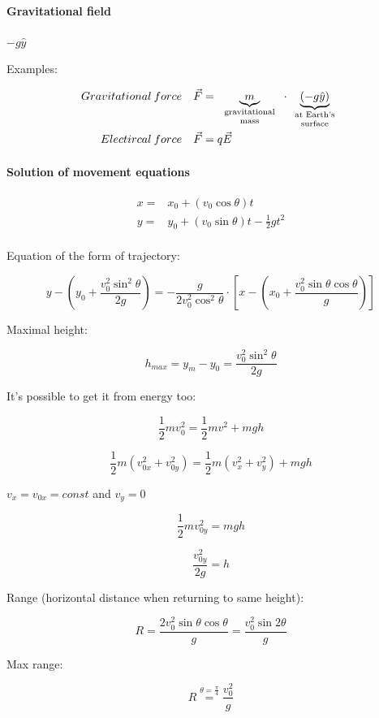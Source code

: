 \paragraph{Gravitational field} $-g\hat{y}$

Examples:

\begin{align*}
Gravitational \: force \quad& \vec{F} = \underbrace{m}_{\parbox{2cm}{\scriptsize  \centering gravitational\\ mass}} \cdot \underbrace{(-g\hat{y})}_{\parbox{1.6cm}{\scriptsize  \centering at Earth's\\ surface}} \\
Electircal \: force \quad& \vec{F} = q\vec{E} \\
\end{align*}

\paragraph{Solution of movement equations} 
 \begin{align*}
x = & x_0 + (v_0 \cos \theta)t  \\
y = & y_0 + (v_0 \sin \theta)t - \frac{1}{2}gt^2\\
\end{align*}

Equation of the form of trajectory:

$$y-\left( y_0 + \frac{v_0^2 \sin^2 \theta}{2g} \right) = -\frac{g}{2v_0^2\cos^2\theta} \cdot \left[ x - \left( x_0 + \frac{v_0^2 \sin\theta \cos \theta}{g} \right) \right]$$

Maximal height:

$$h_{max} = y_m - y_0 = \frac{v_0^2 \sin^2 \theta}{2g}$$

It's possible to get it from energy too:

$$\frac{1}{2}mv_0^2 = \frac{1}{2}mv^2+mgh$$

$$\frac{1}{2}m(v_{0x}^2+v_{0y}^2) = \frac{1}{2}m(v_x^2+v_y^2)+mgh$$

$v_x=v_{0x} = const$ and $v_y=0$

$$\frac{1}{2}mv_{0y}^2= mgh$$

$$\frac{v_{0y}^2}{2g}= h$$

Range (horizontal distance when returning to same height):

$$R = \frac{2v_0^2\sin\theta\cos\theta}{g}=\frac{v_0^2\sin2\theta}{g}$$

Max range:

$$R \stackrel{\theta = \frac{\pi}{4}}{=} \frac{v_0^2}{g}$$

